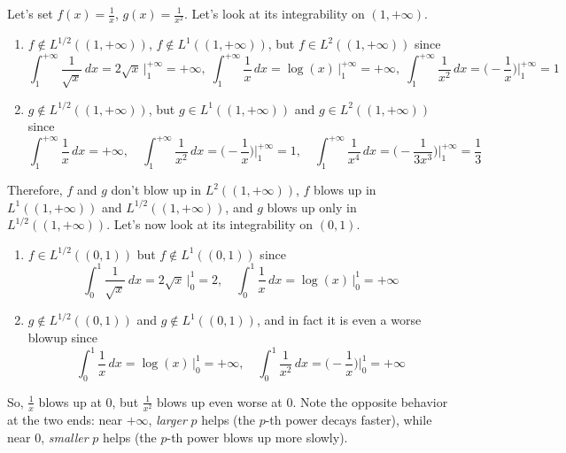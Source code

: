 	\begin{example}
		Let's set $f(x) = \frac{1}{x}$, $g(x) = \frac{1}{x^2}$. Let's look at its integrability on $(1, +\infty)$. 
		\begin{enumerate}
		  \item $f \not\in L^{1/2}((1, +\infty))$, $f \not\in L^1 ((1, +\infty))$, but $f \in L^2((1, +\infty))$ since 
				\begin{equation}
					\int_1^{+\infty} \frac{1}{\sqrt{x}} \,dx = 2\sqrt{x} \,\Big|_1^{+\infty} = +\infty,\; 
					\int_1^{+\infty} \frac{1}{x} \,dx = \log(x) \,\Big|_1^{+\infty} = +\infty, \;
					\int_1^{+\infty} \frac{1}{x^2} \,dx = \Big(-\frac{1}{x}\Big) \bigg|_1^{+\infty} = 1
				\end{equation}

			\item $g \not\in L^{1/2}((1, +\infty))$, but $g \in L^1 ((1, +\infty))$ and $g \in L^2 ((1, +\infty))$ since 
				\begin{equation}
					\int_1^{+\infty} \frac{1}{x} \,dx = +\infty, \quad
					\int_1^{+\infty} \frac{1}{x^2} \,dx = \Big(-\frac{1}{x}\Big) \bigg|_1^{+\infty} = 1, \quad 
					\int_1^{+\infty} \frac{1}{x^4} \,dx = \Big(-\frac{1}{3 x^3}\Big) \bigg|_1^{+\infty} = \frac{1}{3}
				\end{equation}
		\end{enumerate}
		Therefore, $f$ and $g$ don't blow up in $L^2((1, +\infty))$, $f$ blows up in $L^1((1, +\infty))$ and $L^{1/2}((1, +\infty))$, and $g$ blows up only in $L^{1/2}((1, +\infty))$. Let's now look at its integrability on $(0, 1)$. 
		\begin{enumerate}
		  \item $f \in L^{1/2}((0, 1))$ but $f \not\in L^1((0, 1))$ since
				\begin{equation}
					\int_0^1 \frac{1}{\sqrt{x}}\,dx = 2\sqrt{x} \,\Big|^1_0 = 2, \quad 
					\int_0^1 \frac{1}{x}\,dx = \log(x) \,\Big|^1_0 = +\infty
				\end{equation}

			\item $g \not\in L^{1/2}((0, 1))$ and $g \not\in L^1 ((0, 1))$, and in fact it is even a worse blowup since 
				\begin{equation}
					\int_0^1 \frac{1}{x}\,dx = \log(x) \,\Big|^1_0 = +\infty, \quad
					\int_0^1 \frac{1}{x^2}\,dx = \bigg( -\frac{1}{x} \bigg) \bigg|_0^1 = +\infty
				\end{equation}
		\end{enumerate}
		So, $\frac{1}{x}$ blows up at $0$, but $\frac{1}{x^2}$ blows up even worse at $0$. Note the opposite behavior at the two ends: near $+\infty$, \emph{larger} $p$ helps (the $p$-th power decays faster), while near $0$, \emph{smaller} $p$ helps (the $p$-th power blows up more slowly).
	\end{example}

